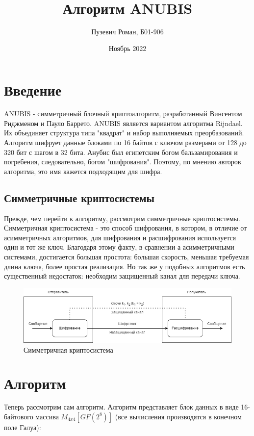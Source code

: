 \documentclass[12pt]{article}
\title{Алгоритм ANUBIS}
\date{Ноябрь 2022}
\author{Пузевич Роман, Б01-906}
\begin{document}
\maketitle

\section{Введение}
ANUBIS - симметричный блочный криптоалгоритм, разработанный Винсентом Риджменом и Пауло Баррето. ANUBIS является вариантом алгоритма Rijndael. Их объединяет структура типа "квадрат" и набор выполняемых преорбазований. Алгоритм шифрует данные блоками по 16 байтов с ключом размерами от 128 до 320 бит с шагом в 32 бита. Анубис был египетским богом бальзамирования и погребения, следовательно, богом "шифрования". Поэтому, по мнению авторов алгоритма, это имя кажется подходящим для шифра.

\subsection{Симметричные криптосистемы}
Прежде, чем перейти к алгоритму, рассмотрим симметричные криптосистемы. Симметричная криптосистема - это способ шифрования, в котором, в отличие от асимметричных алгоритмов, для шифрования и расшифрования используется один и тот же ключ. Благодаря этому факту, в сравнении а асимметричными системами, достигается большая простота: большая скорость, меньшая требуемая длина ключа, более простая реализация. Но так же у подобных алгоритмов есть существенный недостаток: необходим защищенный канал для передачи ключа.


\begin{figure}[h]
    \centering
    \includegraphics[width=0.8\linewidth]{scheme.png}
    \caption{Симметричная криптосистема}
    \label{fig:scheme}
\end{figure}

\section{Алгоритм}
Теперь рассмотрим сам алгоритм. Алгоритм представляет блок данных в виде 16-байтового массива $M_{4x4}[GF(2^{8})]$ (все вычисления производятся в конечном поле Галуа):
\end{document}
